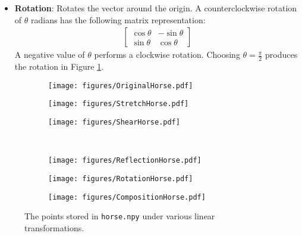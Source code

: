 \begin{itemize}
\item \textbf{Rotation}: %
Rotates the vector around the origin.
A counterclockwise rotation of $\theta$ radians has the following matrix representation:
%
\begin{align*}
\left[\begin{array}{rr}
\cos\theta & -\sin\theta\\
\sin\theta &  \cos\theta
\end{array}\right]
\end{align*}
%
A negative value of $\theta$ performs a clockwise rotation.
Choosing $\theta = \frac{\pi}{2}$ produces the rotation in Figure \ref{fig:linearly-transformed-horses}.

\end{itemize}

\begin{figure}[H] %
\captionsetup[subfigure]{justification=centering}
\centering
\begin{subfigure}{.32\textwidth}
    \centering
    \texttt{[image: figures/OriginalHorse.pdf]}
\end{subfigure}
%
\begin{subfigure}{.32\textwidth}
    \centering
    \texttt{[image: figures/StretchHorse.pdf]}
\end{subfigure}
%
\begin{subfigure}{.32\textwidth}
    \centering
    \texttt{[image: figures/ShearHorse.pdf]}
\end{subfigure}
\\
\begin{subfigure}{.32\textwidth}
    \centering
    \texttt{[image: figures/ReflectionHorse.pdf]}
\end{subfigure}
%
\begin{subfigure}{.32\textwidth}
    \centering
    \texttt{[image: figures/RotationHorse.pdf]}
\end{subfigure}
%
\begin{subfigure}{.32\textwidth}
    \centering
    \texttt{[image: figures/CompositionHorse.pdf]}
\end{subfigure}
\caption{The points stored in \texttt{horse.npy} under various linear transformations.}
\label{fig:linearly-transformed-horses}
\end{figure}


